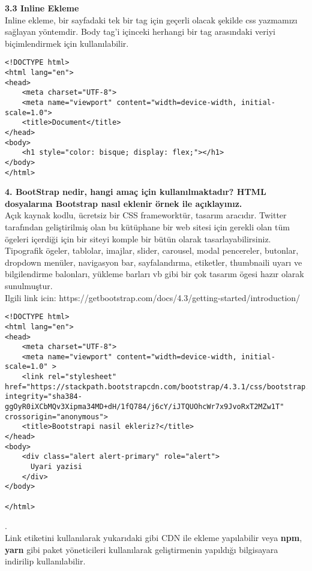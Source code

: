 \documentclass[a4paper,10pt]{article}
\begin{document}
\textbf{3.3 Inline Ekleme}\\

Inline ekleme, bir sayfadaki tek bir tag için geçerli olacak şekilde css yazmamızı sağlayan yöntemdir. Body tag’i içinceki herhangi bir tag arasındaki veriyi biçimlendirmek için kullanılabilir.
    
\begin{lstlisting}
<!DOCTYPE html>
<html lang="en">
<head>
    <meta charset="UTF-8">
    <meta name="viewport" content="width=device-width, initial-scale=1.0">
    <title>Document</title>
</head>
<body>
    <h1 style="color: bisque; display: flex;"></h1>
</body>
</html>
\end{lstlisting}

\pagebreak
    
\textbf{4. BootStrap nedir, hangi amaç için kullanılmaktadır? HTML dosyalarına Bootstrap nasıl eklenir örnek ile açıklayınız.}\\

Açık kaynak kodlu, ücretsiz bir CSS frameworktür, tasarım aracıdır. Twitter tarafından geliştirilmiş olan 
bu kütüphane bir web sitesi için gerekli olan tüm ögeleri içerdiği için
 bir siteyi komple bir bütün olarak tasarlayabilirsiniz. 
 Tipografik ögeler, tablolar, imajlar, slider, carousel, modal pencereler,
  butonlar, dropdown menüler, navigasyon bar, sayfalandırma, etiketler, 
  thumbnaili uyarı ve bilgilendirme balonları, yükleme barları vb gibi bir çok tasarım ögesi 
  hazır olarak sunulmuştur.\\

Ilgili link icin: https://getbootstrap.com/docs/4.3/getting-started/introduction/

\begin{lstlisting}
<!DOCTYPE html>
<html lang="en">
<head>
    <meta charset="UTF-8">
    <meta name="viewport" content="width=device-width, initial-scale=1.0" >
    <link rel="stylesheet" href="https://stackpath.bootstrapcdn.com/bootstrap/4.3.1/css/bootstrap.min.css" integrity="sha384-ggOyR0iXCbMQv3Xipma34MD+dH/1fQ784/j6cY/iJTQUOhcWr7x9JvoRxT2MZw1T" crossorigin="anonymous">
    <title>Bootstrapi nasil ekleriz?</title>
</head>
<body>
    <div class="alert alert-primary" role="alert">
      Uyari yazisi
    </div>
</body>

</html>  
\end{lstlisting}
    
.\\Link etiketini kullanılarak yukarıdaki gibi CDN ile ekleme yapılabilir veya \textbf{npm}, \textbf{yarn} gibi paket yöneticileri kullanılarak geliştirmenin yapıldığı bilgisayara indirilip kullanılabilir.\\
    
\end{document}
